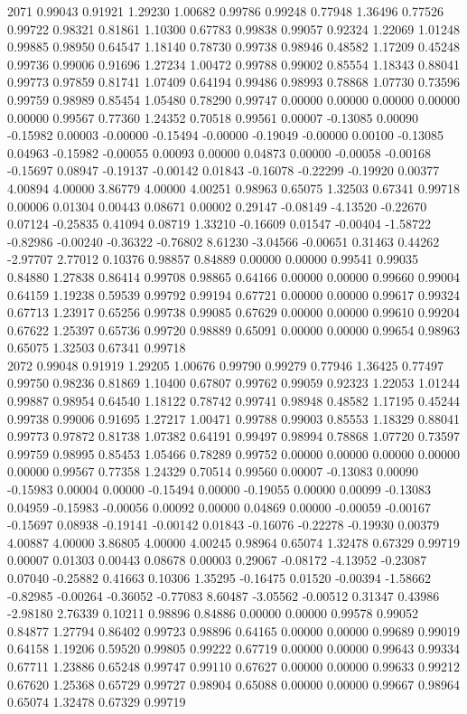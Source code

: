 {2071 0.99043 0.91921 1.29230 1.00682 0.99786 0.99248 0.77948 1.36496 0.77526 0.99722 0.98321 0.81861 1.10300 0.67783 0.99838 0.99057 0.92324 1.22069 1.01248 0.99885 0.98950 0.64547 1.18140 0.78730 0.99738 0.98946 0.48582 1.17209 0.45248 0.99736 0.99006 0.91696 1.27234 1.00472 0.99788 0.99002 0.85554 1.18343 0.88041 0.99773 0.97859 0.81741 1.07409 0.64194 0.99486 0.98993 0.78868 1.07730 0.73596 0.99759 0.98989 0.85454 1.05480 0.78290 0.99747 0.00000 0.00000 0.00000 0.00000 0.00000 0.99567 0.77360 1.24352 0.70518 0.99561 0.00007 -0.13085 0.00090 -0.15982 0.00003 -0.00000 -0.15494 -0.00000 -0.19049 -0.00000 0.00100 -0.13085 0.04963 -0.15982 -0.00055 0.00093 0.00000 0.04873 0.00000 -0.00058 -0.00168 -0.15697 0.08947 -0.19137 -0.00142 0.01843 -0.16078 -0.22299 -0.19920 0.00377 4.00894 4.00000 3.86779 4.00000 4.00251 0.98963 0.65075 1.32503 0.67341 0.99718 0.00006 0.01304 0.00443 0.08671 0.00002 0.29147 -0.08149 -4.13520 -0.22670 0.07124 -0.25835 0.41094 0.08719 1.33210 -0.16609 0.01547 -0.00404 -1.58722 -0.82986 -0.00240 -0.36322 -0.76802 8.61230 -3.04566 -0.00651 0.31463 0.44262 -2.97707 2.77012 0.10376 0.98857 0.84889 0.00000 0.00000 0.99541 0.99035 0.84880 1.27838 0.86414 0.99708 0.98865 0.64166 0.00000 0.00000 0.99660 0.99004 0.64159 1.19238 0.59539 0.99792 0.99194 0.67721 0.00000 0.00000 0.99617 0.99324 0.67713 1.23917 0.65256 0.99738 0.99085 0.67629 0.00000 0.00000 0.99610 0.99204 0.67622 1.25397 0.65736 0.99720 0.98889 0.65091 0.00000 0.00000 0.99654 0.98963 0.65075 1.32503 0.67341 0.99718 \\
2072 0.99048 0.91919 1.29205 1.00676 0.99790 0.99279 0.77946 1.36425 0.77497 0.99750 0.98236 0.81869 1.10400 0.67807 0.99762 0.99059 0.92323 1.22053 1.01244 0.99887 0.98954 0.64540 1.18122 0.78742 0.99741 0.98948 0.48582 1.17195 0.45244 0.99738 0.99006 0.91695 1.27217 1.00471 0.99788 0.99003 0.85553 1.18329 0.88041 0.99773 0.97872 0.81738 1.07382 0.64191 0.99497 0.98994 0.78868 1.07720 0.73597 0.99759 0.98995 0.85453 1.05466 0.78289 0.99752 0.00000 0.00000 0.00000 0.00000 0.00000 0.99567 0.77358 1.24329 0.70514 0.99560 0.00007 -0.13083 0.00090 -0.15983 0.00004 0.00000 -0.15494 0.00000 -0.19055 0.00000 0.00099 -0.13083 0.04959 -0.15983 -0.00056 0.00092 0.00000 0.04869 0.00000 -0.00059 -0.00167 -0.15697 0.08938 -0.19141 -0.00142 0.01843 -0.16076 -0.22278 -0.19930 0.00379 4.00887 4.00000 3.86805 4.00000 4.00245 0.98964 0.65074 1.32478 0.67329 0.99719 0.00007 0.01303 0.00443 0.08678 0.00003 0.29067 -0.08172 -4.13952 -0.23087 0.07040 -0.25882 0.41663 0.10306 1.35295 -0.16475 0.01520 -0.00394 -1.58662 -0.82985 -0.00264 -0.36052 -0.77083 8.60487 -3.05562 -0.00512 0.31347 0.43986 -2.98180 2.76339 0.10211 0.98896 0.84886 0.00000 0.00000 0.99578 0.99052 0.84877 1.27794 0.86402 0.99723 0.98896 0.64165 0.00000 0.00000 0.99689 0.99019 0.64158 1.19206 0.59520 0.99805 0.99222 0.67719 0.00000 0.00000 0.99643 0.99334 0.67711 1.23886 0.65248 0.99747 0.99110 0.67627 0.00000 0.00000 0.99633 0.99212 0.67620 1.25368 0.65729 0.99727 0.98904 0.65088 0.00000 0.00000 0.99667 0.98964 0.65074 1.32478 0.67329 0.99719 \\
}
